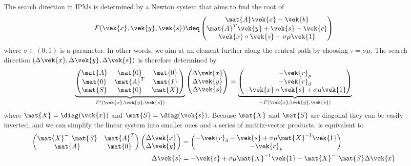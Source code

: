 The search direction in IPMs is determined by a Newton system that aims to find the root of 
\begin{equation}
  F(\vek{x}, \vek{y}, \vek{s}) \deq \begin{pmatrix} \mat{A}\vek{x} - \vek{b} \\ \mat{A}^T \vek{y} + \vek{s} - \vek{c} \\ \vek{x} \circ \vek{s} - \sigma \mu \vek{1} \end{pmatrix}
\end{equation}
where \(\sigma \in (0, 1)\) is a parameter.
In other words, we aim at an element further along the central path by choosing \(\tau = \sigma \mu\).
The search direction \((\Delta\vek{x}, \Delta\vek{y}, \Delta\vek{s})\) is therefore determined by 
\begin{equation}\label{eqn:newton-system}
  \underbrace{
  \begin{pmatrix}
    \mat{A} & \mat{0}   & \mat{0} \\
    \mat{0} & \mat{A}^T & \mat{I} \\
    \mat{S} & \mat{0}   & \mat{X} \\
  \end{pmatrix}
  }_{F'(\vek{x}, \vek{y}, \vek{s})}
  \begin{pmatrix} \Delta\vek{x} \\ \Delta\vek{y} \\ \Delta\vek{s} \end{pmatrix}
  =
  \underbrace{
  \begin{pmatrix} -\vek{r}_p \\ -\vek{r}_d \\ - \vek{x} \circ \vek{s} + \sigma \mu \vek{1} \end{pmatrix}
  }_{-F(\vek{x}, \vek{y}, \vek{s})}
\end{equation}
where \(\mat{X} = \diag(\vek{x})\) and \(\mat{S} = \diag(\vek{s})\).
Because \(\mat{X}\) and \(\mat{S}\) are diagonal they can be easily inverted, and we can simplify the linear system into smaller ones and a series of matrix-vector products.
 is equivalent to 
\begin{subequations}\label{eqn:augmented-system-system}
  \begin{align}
    \begin{pmatrix}
      \mat{X}^{-1} \mat{S} & \mat{A}^T \\
      \mat{A}              & \mat{0}
    \end{pmatrix}
    \begin{pmatrix}
      \Delta\vek{x} \\
      \Delta\vek{y}
    \end{pmatrix}
    &=
    \begin{pmatrix}
      -\vek{r}_d -\vek{s} + \sigma \mu \mat{X}^{-1} \vek{1} \\
      -\vek{r}_p
    \end{pmatrix} \label{eqn:augmented-system} \\
    \Delta\vek{s} &= -\vek{s} + \sigma \mu \mat{X}^{-1} \vek{1} - \mat{X}^{-1} \mat{S} \Delta\vek{x} \label{eqn:s-from-augmented}
  \end{align}
\end{subequations}
